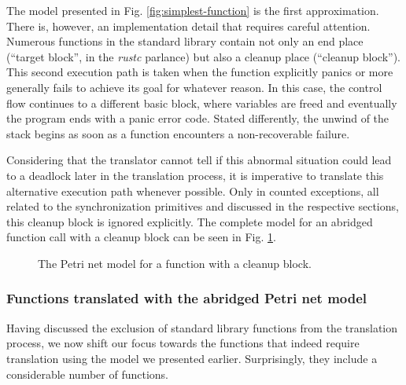 The model presented in Fig. \ref{fig:simplest-function} is the first approximation.
There is, however, an implementation detail that requires careful attention.
Numerous functions in the standard library contain not only an end place
(``target block'', in the \emph{rustc} parlance) but also a cleanup place (``cleanup block'').
This second execution path is taken when the function explicitly panics
or more generally fails to achieve its goal for whatever reason.
In this case, the control flow continues to a different basic block,
where variables are freed and eventually the program ends with a panic error code.
Stated differently, the unwind of the stack begins
as soon as a function encounters a non-recoverable failure.

Considering that the translator cannot tell if this abnormal situation could lead
to a deadlock later in the translation process, it is imperative to translate
this alternative execution path whenever possible.
Only in counted exceptions, all related to the synchronization primitives
and discussed in the respective sections, this cleanup block is ignored explicitly.
The complete model for an abridged function call with a cleanup block
can be seen in Fig. \ref{fig:function-with-cleanup}.

\begin{figure}[!htb]
    \centering
    
    \caption{The Petri net model for a function with a cleanup block.}
    \label{fig:function-with-cleanup}
\end{figure}

\subsubsection{Functions translated with the abridged Petri net model}

Having discussed the exclusion of standard library functions from the translation process,
we now shift our focus towards the functions that indeed require translation using the model we presented earlier.
Surprisingly, they include a considerable number of functions.

